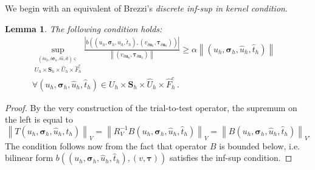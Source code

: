 \documentclass[letterpaper]{article}
\def\btau{\boldsymbol\tau}
\def\bsigma{\boldsymbol\sigma}
\def\bbeta{\boldsymbol\beta}
\newcommand{\bs}[1]{\boldsymbol{#1}}
\newcommand{\norm}[1]{\left\| #1 \right\|}
\newcommand{\snorm}[1]{\left| #1 \right|}
\newcommand{\vdeltau}{v_{\delta\bs u_h}}
\newcommand{\taudeltau}{\btau_{\delta\bs u_h}}
\newtheorem{lemma}{Lemma}
\begin{document}
We begin with an equivalent of Brezzi's \emph{discrete inf-sup in kernel
condition}.
\begin{lemma}
\label{lemma:infsuplemma}
The following condition holds:
\begin{align}
\sup_{\stackrel{
(\delta u_h,\delta\bsigma_h,\delta\hat u,\delta\hat t)\in}
{U_h\times\bs S_h\times\hat U_h\times\hat F_h^c}
}
\frac{\snorm{
b((u_h,\bsigma_h,\hat u_h,\hat t_h), (\vdeltau,\taudeltau))
}}
{\norm{(\vdeltau,\taudeltau)}}
\ge\alpha\norm{(u_h,\bsigma_h,\hat u_h,\hat t_h)}\quad\nonumber\\
\forall(u_h,\bsigma_h,\hat u_h,\hat t_h)
\in U_h\times\bs S_h\times\hat U_h\times\hat F_h^c\,.
\label{eq:infsup}
\end{align}

\end{lemma}
\begin{proof}
By the very construction of the trial-to-test operator, the supremum on the
left is equal to
\begin{equation}
\norm{T(u_h,\bsigma_h,\hat u_h,\hat t_h)}_{V}
=\norm{R_V^{-1}B(u_h,\bsigma_h,\hat u_h, \hat t_h)}_{V}
=\norm{B(u_h,\bsigma_h,\hat u_h, \hat t_h)}_{V'}
\label{eq:infsupproof}
\end{equation}
The condition follows now from the fact that operator $B$ is bounded below,
i.e. bilinear form \linebreak$b((u_h,\bsigma_h,\hat u_h, \hat t_h),(v,\btau))$ satisfies
the inf-sup condition.
\end{proof}
\end{document}
